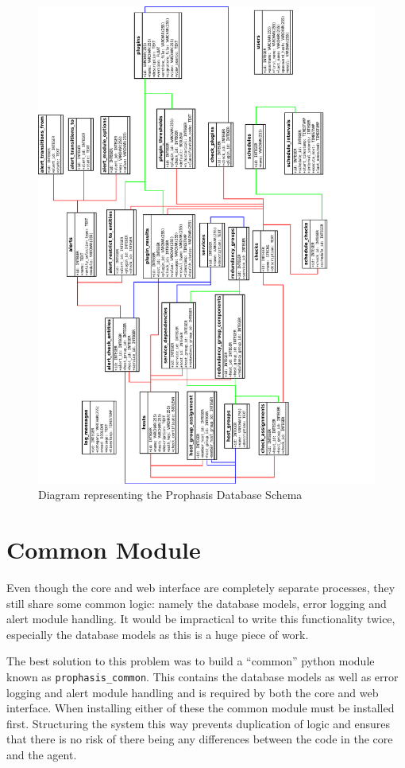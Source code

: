 \documentclass[bsc,logo,twoside,parskip,singlespacing,notimes]{infthesis}
\begin{document}
\begin{figure}[H]
	\caption{Diagram representing the Prophasis Database Schema}
	\label{database-diagram}
	\includegraphics[scale=0.84]{assets/schema.pdf}
\end{figure}

\section{Common Module}

	Even though the core and web interface are completely separate processes, they
	still share some common logic: namely the database models, error logging and
	alert module handling.  It would be impractical to write this functionality
	twice, especially the database models as this is a huge piece of work.


	The best solution to this problem was to build a ``common'' python module known
	as \texttt{prophasis\_common}.  This contains the database models as well as
	error logging and alert module handling and is required by both the core and
	web interface.  When installing either of these the common module must be
	installed first.  Structuring the system this way prevents duplication of
	logic and ensures that there is no risk of there being any differences between
	the code in the core and the agent.
\end{document}
